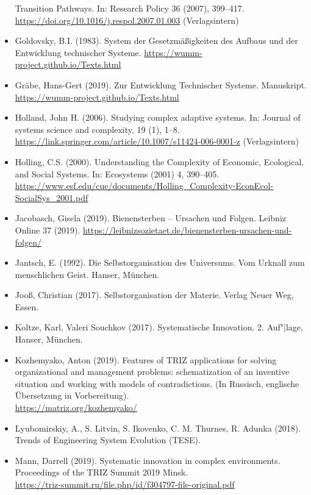 \documentclass[11pt,a4paper]{article}
\begin{document}
\begin{itemize}
  Transition Pathways. In: Research Policy 36 (2007), 399–417.\\
  \url{https://doi.org/10.1016/j.respol.2007.01.003} (Verlagsintern)
\item Goldovsky, B.I. (1983). System der Gesetzmäßigkeiten des Aufbaus und der
  Entwicklung technischer Systeme.
  \url{https://wumm-project.github.io/Texts.html} 
\item Gräbe, Hans-Gert (2019). Zur Entwicklung Technischer Systeme.
  Manuskript. \\ \url{https://wumm-project.github.io/Texts.html}
\item Holland, John H. (2006). Studying complex adaptive systems. In: Journal
  of systems science and complexity, 19 (1),
  1–8.\\ \url{https://link.springer.com/article/10.1007/s11424-006-0001-z}
  (Verlagsintern)
\item Holling, C.S. (2000). Understanding the Complexity of Economic,
  Ecological, and Social Systems. In: Ecosystems (2001) 4, 390–405.
  \url{https://www.esf.edu/cue/documents/Holling_Complexity-EconEcol-SocialSys_2001.pdf}
\item Jacobasch, Gisela (2019). Bienensterben -- Ursachen und Folgen.  Leibniz
  Online 37 (2019).
  \url{https://leibnizsozietaet.de/bienensterben-ursachen-und-folgen/}
\item Jantsch, E. (1992). Die Selbstorganisation des Universums. Vom Urknall
  zum menschlichen Geist.  Hanser, München.
\item Jooß, Christian (2017). Selbstorganisation der Materie.  Verlag Neuer
  Weg, Essen.
\item Koltze, Karl, Valeri Souchkov (2017). Systematische Innovation.
  2. Auf"|lage, Hanser, München.
\item Kozhemyako, Anton (2019). Features of TRIZ applications for solving
  organizational and management problems: schematization of an inventive
  situation and working with models of contradictions. (In Russisch, englische
  Übersetzung in Vorbereitung).\\ \url{https://matriz.org/kozhemyako/}
\item Lyubomirskiy, A., S. Litvin, S. Ikovenko, C. M. Thurnes, R. Adunka
  (2018).  Trends of Engineering System Evolution (TESE).
\item Mann, Darrell (2019).  Systematic innovation in complex
  environments. Proceedings of the TRIZ Summit 2019 Minsk.\\
  \url{https://triz-summit.ru/file.php/id/f304797-file-original.pdf} 

\end{itemize}
\end{document}
